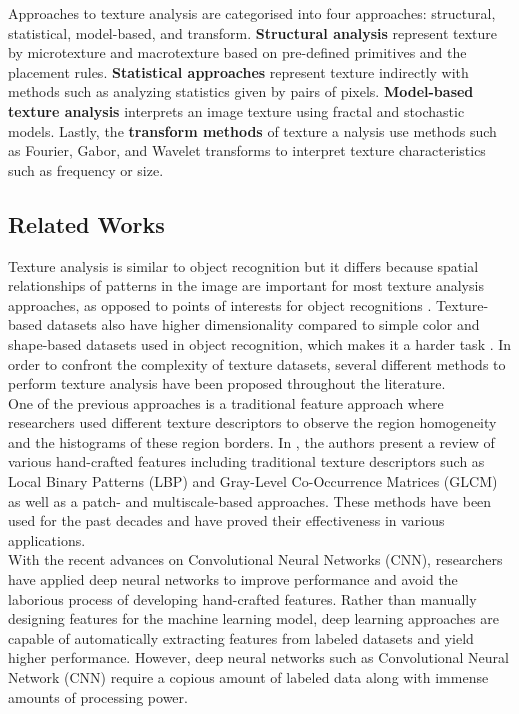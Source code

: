 \documentclass[10pt,twocolumn,letterpaper]{article}
\begin{document}
 Approaches to texture analysis are categorised into four approaches: structural, statistical, model-based, and transform. {\bf Structural analysis} represent texture by microtexture and macrotexture based on pre-defined primitives and the placement rules. {\bf Statistical approaches} represent texture indirectly with methods such as analyzing statistics given by pairs of pixels. {\bf Model-based texture analysis} interprets an image texture using fractal and stochastic models. Lastly, the {\bf transform methods} of texture a nalysis use methods such as Fourier, Gabor, and Wavelet transforms to interpret texture characteristics such as frequency or size. \cite{Materka98textureanalysis}




\subsection{Related Works}


\par Texture analysis is similar to object recognition but it differs because spatial relationships of patterns in the image are important for most texture analysis approaches, as opposed to points of interests for object recognitions \cite{Cavalin2017methods}. Texture-based datasets also have higher dimensionality compared to simple color and shape-based datasets used in object recognition, which makes it a harder task \cite{Basu2018deeptexture}. In order to confront the complexity of texture datasets, several different methods to perform texture analysis have been proposed throughout the literature.
\\


 One of the previous approaches is a traditional feature approach where researchers used different texture descriptors to observe the region homogeneity and the histograms of these region borders. In \cite{Basu2018deeptexture}, the authors present a review of various hand-crafted features including traditional texture descriptors such as Local Binary Patterns (LBP)\cite{Ojala2002lbp} and Gray-Level Co-Occurrence Matrices (GLCM)\cite{Haralick1973GLCM} as well as a patch- and multiscale-based approaches. These methods have been used for the past decades and have proved their effectiveness in various applications. 
 \\
 
 With the recent advances on Convolutional Neural Networks (CNN), researchers have applied deep neural networks to improve performance and avoid the laborious process of developing hand-crafted features. Rather than manually designing features for the machine learning model, deep learning approaches are capable of automatically extracting features from labeled datasets and yield higher performance. However, deep neural networks such as Convolutional Neural Network (CNN) require a copious amount of labeled data along with immense amounts of processing power. 
\\
\end{document}
